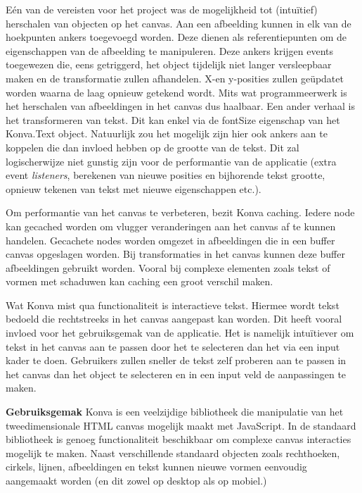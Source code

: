 E\'{e}n van de vereisten voor het project was de mogelijkheid tot (intu\"{i}tief) herschalen van objecten op het canvas. Aan een afbeelding kunnen in elk van de hoekpunten ankers toegevoegd worden. Deze dienen als referentiepunten om de eigenschappen van de afbeelding te manipuleren. Deze ankers krijgen events toegewezen die, eens getriggerd, het object tijdelijk niet langer versleepbaar maken en de transformatie zullen afhandelen. X-en y-posities zullen ge\"{u}pdatet worden waarna de laag opnieuw getekend wordt. Mits wat programmeerwerk is het herschalen van afbeeldingen in het canvas dus haalbaar. Een ander verhaal is het transformeren van tekst. Dit kan enkel via de fontSize eigenschap van het Konva.Text object. Natuurlijk zou het mogelijk zijn hier ook ankers aan te koppelen die dan invloed hebben op de grootte van de tekst. Dit zal logischerwijze niet gunstig zijn voor de performantie van de applicatie (extra event \textit{listeners}, berekenen van nieuwe posities en bijhorende tekst grootte, opnieuw tekenen van tekst met nieuwe eigenschappen etc.). %

Om performantie van het canvas te verbeteren, bezit Konva caching. Iedere node kan gecached worden om vlugger veranderingen aan het canvas af te kunnen handelen. Gecachete nodes worden omgezet in afbeeldingen die in een buffer canvas opgeslagen worden. Bij transformaties in het canvas kunnen deze buffer afbeeldingen gebruikt worden. Vooral bij complexe elementen zoals tekst of vormen met schaduwen kan caching een groot verschil maken. 

Wat Konva mist qua functionaliteit is interactieve tekst. Hiermee wordt tekst bedoeld die rechtstreeks in het canvas aangepast kan worden. Dit heeft vooral invloed voor het gebruiksgemak van de applicatie. Het is namelijk intu\"{i}tiever om tekst in het canvas aan te passen door het te selecteren dan het via een input kader te doen. Gebruikers zullen sneller de tekst zelf proberen aan te passen in het canvas dan het object te selecteren en in een input veld de aanpassingen te maken.  %

\textbf{Gebruiksgemak} \break
Konva is een veelzijdige bibliotheek die manipulatie van het tweedimensionale HTML canvas mogelijk maakt met JavaScript. In de standaard bibliotheek is genoeg functionaliteit beschikbaar om complexe canvas interacties mogelijk te maken. Naast verschillende standaard objecten zoals rechthoeken, cirkels, lijnen, afbeeldingen en tekst kunnen nieuwe vormen eenvoudig aangemaakt worden (en dit zowel op desktop als op mobiel.)

